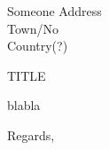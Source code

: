 \documentclass[12pt,a4paper]{letter}
\date{DD. month YYYY}
\begin{document}
\begin{letter}{Someone
Address\\
Town/No\\
Country(?)}

\bigskip

\opening{TITLE}
blabla

\bigskip

\closing{Regards,}

\end{letter}
\end{document}

